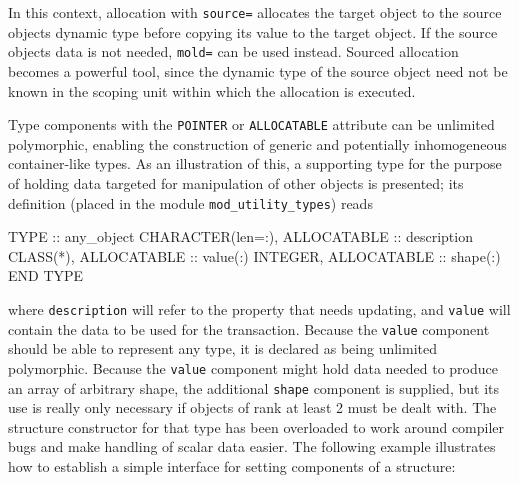 \documentclass[
]{scrartcl}
\newenvironment{Shaded}{}{}
\newcommand{\DataTypeTok}[1]{\textcolor[rgb]{0.56,0.13,0.00}{#1}}
\newcommand{\FunctionTok}[1]{\textcolor[rgb]{0.02,0.16,0.49}{#1}}
\newcommand{\NormalTok}[1]{#1}
\begin{document}
In this context, allocation with \texttt{source=} allocates the target
object to the source object\textquotesingle s dynamic type before
copying its value to the target object. If the source
object\textquotesingle s data is not needed, \texttt{mold=} can be used
instead. Sourced allocation becomes a powerful tool, since the dynamic
type of the source object need not be known in the scoping unit within
which the allocation is executed.

Type components with the \texttt{POINTER} or \texttt{ALLOCATABLE}
attribute can be unlimited polymorphic, enabling the construction of
generic and potentially inhomogeneous container-like types. As an
illustration of this, a supporting type for the purpose of holding data
targeted for manipulation of other objects is presented; its definition
(placed in the module \texttt{mod\_utility\_types}) reads

\begin{Shaded}
\begin{Highlighting}[]
\DataTypeTok{TYPE} \DataTypeTok{::}\NormalTok{ any\_object}
   \DataTypeTok{CHARACTER(len=:)}\NormalTok{, }\DataTypeTok{ALLOCATABLE} \DataTypeTok{::}\NormalTok{ description}
   \DataTypeTok{CLASS(*)}\NormalTok{, }\DataTypeTok{ALLOCATABLE} \DataTypeTok{::} \DataTypeTok{value}\NormalTok{(:)}
   \DataTypeTok{INTEGER}\NormalTok{, }\DataTypeTok{ALLOCATABLE} \DataTypeTok{::} \FunctionTok{shape}\NormalTok{(:)}
\DataTypeTok{END TYPE}
\end{Highlighting}
\end{Shaded}

where \texttt{description} will refer to the property that needs
updating, and \texttt{value} will contain the data to be used for the
transaction. Because the \texttt{value} component should be able to
represent any type, it is declared as being unlimited polymorphic.
Because the \texttt{value} component might hold data needed to produce
an array of arbitrary shape, the additional \texttt{shape} component is
supplied, but its use is really only necessary if objects of rank at
least 2 must be dealt with. The structure constructor for that type has
been overloaded to work around compiler bugs and make handling of scalar
data easier. The following example illustrates how to establish a simple
interface for setting components of a structure:
\end{document}
